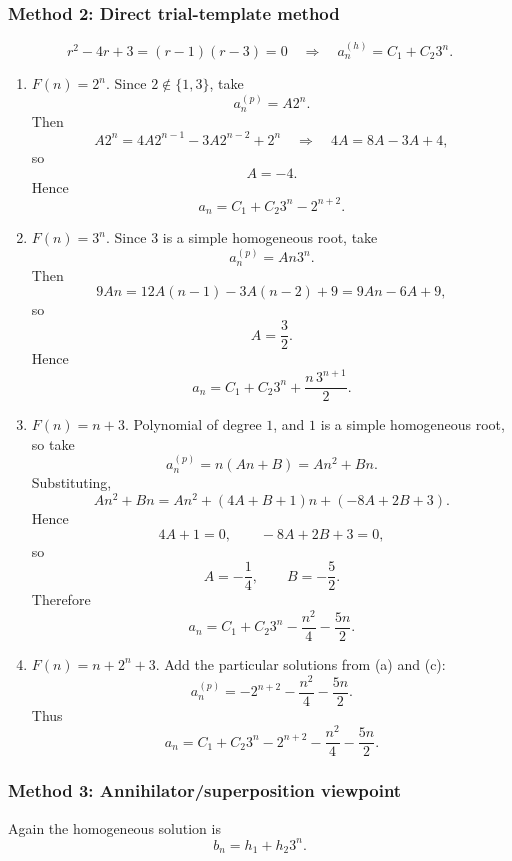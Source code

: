 \documentclass[12pt]{article}
\begin{document}
\newpage
\subsubsection{Method 2: Direct trial-template method}
\[
r^2-4r+3=(r-1)(r-3)=0
\quad\Longrightarrow\quad
a_n^{(h)}=C_1+C_2 3^n.
\]

\begin{enumerate}[label=(\alph*)]
\item \(F(n)=2^n\). Since \(2\notin\{1,3\}\), take
\[
a_n^{(p)}=A2^n.
\]
Then
\[
A2^n=4A2^{n-1}-3A2^{n-2}+2^n
\quad\Longrightarrow\quad
4A=8A-3A+4,
\]
so
\[
A=-4.
\]
Hence
\[
\boxed{a_n=C_1+C_2 3^n-2^{n+2}.}
\]

\item \(F(n)=3^n\). Since \(3\) is a simple homogeneous root, take
\[
a_n^{(p)}=An3^n.
\]
Then
\[
9An=12A(n-1)-3A(n-2)+9=9An-6A+9,
\]
so
\[
A=\frac32.
\]
Hence
\[
\boxed{a_n=C_1+C_2 3^n+\frac{n\,3^{n+1}}{2}.}
\]

\item \(F(n)=n+3\). Polynomial of degree \(1\), and \(1\) is a simple homogeneous root, so take
\[
a_n^{(p)}=n(An+B)=An^2+Bn.
\]
Substituting,
\[
An^2+Bn=An^2+(4A+B+1)n+(-8A+2B+3).
\]
Hence
\[
4A+1=0,\qquad -8A+2B+3=0,
\]
so
\[
A=-\frac14,\qquad B=-\frac52.
\]
Therefore
\[
\boxed{a_n=C_1+C_2 3^n-\frac{n^2}{4}-\frac{5n}{2}.}
\]

\item \(F(n)=n+2^n+3\). Add the particular solutions from (a) and (c):
\[
a_n^{(p)}=-2^{n+2}-\frac{n^2}{4}-\frac{5n}{2}.
\]
Thus
\[
\boxed{a_n=C_1+C_2 3^n-2^{n+2}-\frac{n^2}{4}-\frac{5n}{2}.}
\]
\end{enumerate}

\newpage
\subsubsection{Method 3: Annihilator/superposition viewpoint}
Again the homogeneous solution is
\[
b_n=h_1+h_2 3^n.
\]
\end{document}
